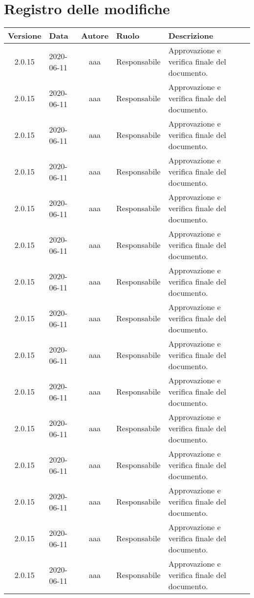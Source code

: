 \section*{Registro delle modifiche}
\setcounter{table}{-1}
{


\centering
\renewcommand{\arraystretch}{1.5}
\begin{longtable}{c C{3.5cm} c C{3.5cm} C{3.5cm}}
\textbf{Versione} &
\textbf{Data}&
\textbf{Autore}&
\textbf{Ruolo}&
\textbf{Descrizione}\\
\endhead

2.0.15 & 2020-06-11 & aaa & Responsabile & Approvazione e verifica finale del documento. \\
2.0.15 & 2020-06-11 & aaa & Responsabile & Approvazione e verifica finale del documento. \\
2.0.15 & 2020-06-11 & aaa & Responsabile & Approvazione e verifica finale del documento. \\
2.0.15 & 2020-06-11 & aaa & Responsabile & Approvazione e verifica finale del documento. \\
2.0.15 & 2020-06-11 & aaa & Responsabile & Approvazione e verifica finale del documento. \\
2.0.15 & 2020-06-11 & aaa & Responsabile & Approvazione e verifica finale del documento. \\
2.0.15 & 2020-06-11 & aaa & Responsabile & Approvazione e verifica finale del documento. \\
2.0.15 & 2020-06-11 & aaa & Responsabile & Approvazione e verifica finale del documento. \\
2.0.15 & 2020-06-11 & aaa & Responsabile & Approvazione e verifica finale del documento. \\
2.0.15 & 2020-06-11 & aaa & Responsabile & Approvazione e verifica finale del documento. \\
2.0.15 & 2020-06-11 & aaa & Responsabile & Approvazione e verifica finale del documento. \\
2.0.15 & 2020-06-11 & aaa & Responsabile & Approvazione e verifica finale del documento. \\
2.0.15 & 2020-06-11 & aaa & Responsabile & Approvazione e verifica finale del documento. \\
2.0.15 & 2020-06-11 & aaa & Responsabile & Approvazione e verifica finale del documento. \\
2.0.15 & 2020-06-11 & aaa & Responsabile & Approvazione e verifica finale del documento. \\

\end{longtable}}
